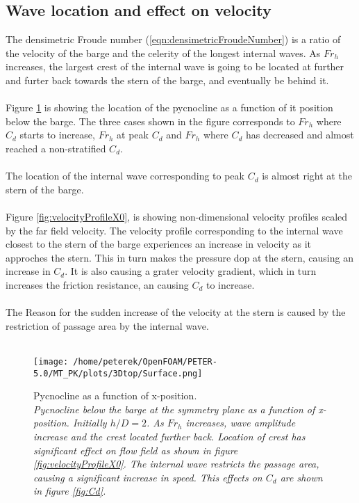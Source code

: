 \documentclass[a4paper, 12pt]{report}
\begin{document}
\subsection{Wave location and effect on velocity}
The densimetric Froude number (\ref{eqn:densimetricFroudeNumber}) is a ratio of the velocity of the barge and the celerity of the longest internal waves. As $Fr_h$ increases, the largest crest of the internal wave is going to be located at further and furter back towards the stern of the barge, and eventually be behind it.\\
\\
Figure \ref{fig:eta1} is showing the location of the pycnocline as a function of it position below the barge. The three cases shown in the figure corresponds to $Fr_h$ where $C_d$ starts to increase, $Fr_h$ at peak $C_d$ and $Fr_h$ where $C_d$ has decreased and almost reached a non-stratified $C_d$.\\
\\
The location of the internal wave corresponding to peak $C_d$ is almost right at the stern of the barge.\\
\\
Figure \ref{fig:velocityProfileX0}, is showing non-dimensional velocity profiles scaled by the far field velocity. The velocity profile corresponding to the internal wave closest to the stern of the barge experiences an increase in velocity as it approches the stern. This in turn makes the pressure dop at the stern, causing an increase in $C_d$. It is also causing a grater velocity gradient, which in turn increases the friction resistance, an causing $C_d$ to increase.\\
\\
The Reason for the sudden increase of the velocity at the stern is caused by the restriction of passage area by the internal wave.\\
\\ 
\begin{minipage}[t]{.45\textwidth} 
	\begin{figure}[H]
		\centering
		\texttt{[image: /home/peterek/OpenFOAM/PETER-5.0/MT\_PK/plots/3Dtop/Surface.png]}
		\caption{Pycnocline as a function of x-position. \\ \textit{Pycnocline below the barge at the symmetry plane as a function of x-position. Initially $h/D=2$. As $Fr_h$ increases, wave amplitude increase and the crest located further back. Location of crest has significant effect on flow field as shown in figure \ref{fig:velocityProfileX0}. The internal wave restricts the passage area, causing a significant increase in speed. This effects on $C_d$ are shown in figure \ref{fig:Cd}.}}
		\label{fig:eta1}
	\end{figure}
\end{minipage}\hfill
\end{document}
